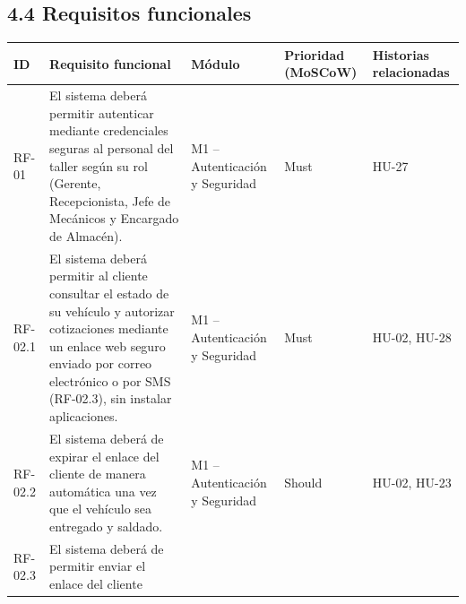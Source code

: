 \subsection{4.4 Requisitos funcionales}\label{requisitos-funcionales}

{\def\LTcaptype{none} %
\begin{longtable}[]{@{}
  >{\raggedright\arraybackslash}p{}
  >{\raggedright\arraybackslash}p{}
  >{\raggedright\arraybackslash}p{}
  >{\raggedright\arraybackslash}p{}
  >{\raggedright\arraybackslash}p{}@{}}
\toprule\noalign{}
\begin{minipage}[b]{\linewidth}\raggedright
\textbf{ID}
\end{minipage} & \begin{minipage}[b]{\linewidth}\raggedright
\textbf{Requisito funcional}
\end{minipage} & \begin{minipage}[b]{\linewidth}\raggedright
\textbf{Módulo}
\end{minipage} & \begin{minipage}[b]{\linewidth}\raggedright
\textbf{Prioridad (MoSCoW)}
\end{minipage} & \begin{minipage}[b]{\linewidth}\raggedright
\textbf{Historias relacionadas}
\end{minipage} \\
\midrule\noalign{}
\endhead
\bottomrule\noalign{}
\endlastfoot
RF-01 & El sistema deberá permitir autenticar mediante credenciales
seguras al personal del taller según su rol (Gerente, Recepcionista,
Jefe de Mecánicos y Encargado de Almacén). & M1 -- Autenticación y
Seguridad & Must & HU-27 \\
RF-02.1 & El sistema deberá permitir al cliente consultar el estado de
su vehículo y autorizar cotizaciones mediante un enlace web seguro
enviado por correo electrónico o por SMS (RF-02.3), sin instalar
aplicaciones. & M1 -- Autenticación y Seguridad & Must & HU-02, HU-28 \\
RF-02.2 & El sistema deberá de expirar el enlace del cliente de manera
automática una vez que el vehículo sea entregado y saldado. & M1 --
Autenticación y Seguridad & Should & HU-02, HU-23 \\
RF-02.3 & El sistema deberá de permitir enviar el enlace del cliente

\end{longtable}}

